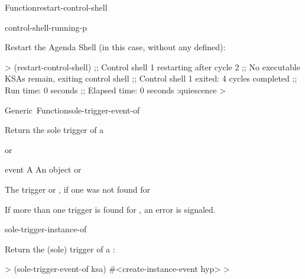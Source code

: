 \documentclass[10pt,twoside,english,pdftex]{article}
\begin{document}
\begin{functiondoc}{Function}{restart-control-shell}{%
    }
\fnerrors
\threadsnotstarted

\begin{alsos}{control-shell-running-p}
\end{alsos}

\fnexample
%
Restart the Agenda Shell (in this case, without any  defined):
%
\W\supp
\begin{example}
  > (restart-control-shell)
  ;; Control shell 1 restarting after cycle 2
  ;; No executable KSAs remain, exiting control shell
  ;; Control shell 1 exited: 4 cycles completed
  ;; Run time: 0 seconds
  ;; Elapsed time: 0 seconds
  :quiescence
  >
\end{example}

%
\fnnote \pollingnote

\end{functiondoc}


\begin{functiondoc}{Generic~Function}{sole-trigger-event-of}{ 
    }
%
%
%

\fnsyntax

\fnpurpose Return the sole trigger  of a 

\fnmethods
{}%
  {\code{(} 
  \returns{}  or \nil}

\fnpackage {}

\fnmodule {}

\fnargs
\begin{args}{event}
\arg[ksa] A 
\arg[event] An  object or \nil{}
\end{args}

\fnreturns The trigger  or \nil, if one was not found for
  
\fndescription If more than one trigger  is found for
, an error is signaled.

\begin{alsos}{sole-trigger-instance-of}
\end{alsos}

\fnexample
%
Return the (sole) trigger  of a :
%
\W\supp
\begin{example}
  > (sole-trigger-event-of ksa)
  #<create-instance-event hyp>
  >
\end{example}

\end{functiondoc}
\end{document}
